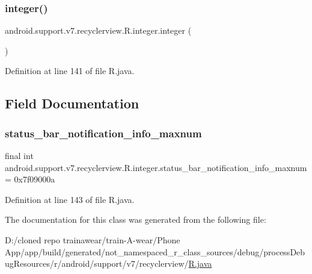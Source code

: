 \subsubsection{\texorpdfstring{integer()}{integer()}}
{\footnotesize\ttfamily android.\+support.\+v7.\+recyclerview.\+R.\+integer.\+integer (\begin{DoxyParamCaption}{ }\end{DoxyParamCaption})\hspace{0.3cm}{\ttfamily [private]}}



Definition at line 141 of file R.\+java.


\begin{DoxyCode}{0}

\end{DoxyCode}


\subsection{Field Documentation}
\mbox{\label{classandroid_1_1support_1_1v7_1_1recyclerview_1_1_r_1_1integer_ad9015376b52984f0f7509667c0934f11}} 
\subsubsection{\texorpdfstring{status\_bar\_notification\_info\_maxnum}{status\_bar\_notification\_info\_maxnum}}
{\footnotesize\ttfamily final int android.\+support.\+v7.\+recyclerview.\+R.\+integer.\+status\+\_\+bar\+\_\+notification\+\_\+info\+\_\+maxnum = 0x7f09000a\hspace{0.3cm}{\ttfamily [static]}}



Definition at line 143 of file R.\+java.



The documentation for this class was generated from the following file\+:\begin{DoxyCompactItemize}
\item 
D\+:/cloned repo trainawear/train-\/\+A-\/wear/\+Phone App/app/build/generated/not\+\_\+namespaced\+\_\+r\+\_\+class\+\_\+sources/debug/process\+Debug\+Resources/r/android/support/v7/recyclerview/\mbox{\hyperlink{process_debug_resources_2r_2android_2support_2v7_2recyclerview_2_r_8java}{R.\+java}}\end{DoxyCompactItemize}
